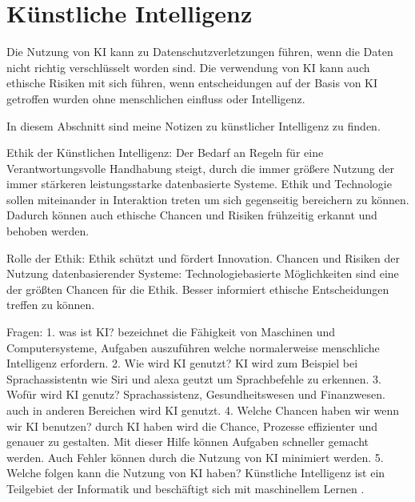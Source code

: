 \section{Künstliche Intelligenz}
\label{sec:ai}


Die Nutzung von KI kann zu Datenschutzverletzungen führen, wenn die Daten nicht richtig verschlüsselt worden sind. 
Die verwendung von KI kann auch ethische Risiken mit sich führen, wenn entscheidungen auf der Basis von KI getroffen wurden ohne menschlichen einfluss oder Intelligenz. 

In diesem Abschnitt sind meine Notizen zu künstlicher Intelligenz zu finden.


Ethik der Künstlichen Intelligenz: 
Der Bedarf an Regeln für eine Verantwortungsvolle Handhabung steigt, durch die immer größere Nutzung der immer stärkeren leistungsstarke datenbasierte Systeme. 
Ethik und Technologie sollen miteinander in Interaktion treten um sich gegenseitig bereichern zu können. Dadurch können auch ethische Chancen und Risiken frühzeitig erkannt und behoben werden. 

Rolle der Ethik: 
Ethik schützt und fördert Innovation.
Chancen und Risiken der Nutzung datenbasierender Systeme:
Technologiebasierte Möglichkeiten sind eine der größten Chancen für die Ethik. Besser informiert ethische Entscheidungen treffen zu können.  

Fragen: 
1. was ist KI?
bezeichnet die Fähigkeit von Maschinen und Computersysteme, Aufgaben auszuführen welche normalerweise menschliche Intelligenz erfordern. 
2. Wie wird KI genutzt?
KI wird zum Beispiel bei Sprachassistentn wie Siri und alexa geutzt um Sprachbefehle zu erkennen. 
3. Wofür wird KI genutz? 
Sprachassistenz, Gesundheitswesen und Finanzwesen. auch in anderen Bereichen wird KI genutzt. 
4. Welche Chancen haben wir wenn wir KI benutzen?
durch KI haben wird die Chance, Prozesse effizienter und genauer zu gestalten. Mit dieser Hilfe können Aufgaben
schneller gemacht werden. Auch Fehler können durch die Nutzung von KI minimiert werden. 
5. Welche folgen kann die Nutzung von KI haben?
Künstliche Intelligenz ist ein Teilgebiet der Informatik und beschäftigt sich mit maschinellem Lernen \citep{ai-wikipedia}.